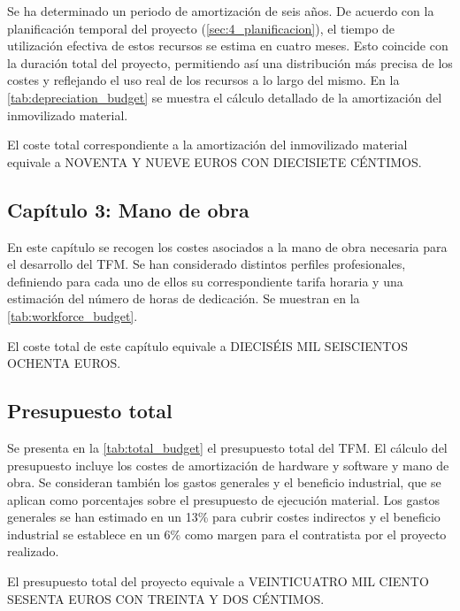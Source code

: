 Se ha determinado un periodo de amortización de seis años. De acuerdo con la planificación 
temporal del proyecto (\autoref{sec:4_planificacion}), el tiempo de utilización efectiva de estos recursos 
se estima en cuatro meses. Esto coincide con la duración total del proyecto, permitiendo así una distribución más
precisa de los costes y reflejando el uso real de los recursos a lo largo del mismo. En la \autoref{tab:depreciation_budget} 
se muestra el cálculo detallado de la amortización del inmovilizado material.



El coste total correspondiente a la amortización del inmovilizado material equivale a NOVENTA Y NUEVE EUROS CON DIECISIETE CÉNTIMOS.

\newpage

\subsection{Capítulo 3: Mano de obra} \label{sec:5_presupuesto_mano_obra}
En este capítulo se recogen los costes asociados a la mano de obra necesaria para el desarrollo del TFM. Se han considerado 
distintos perfiles profesionales, definiendo para cada uno de ellos su correspondiente tarifa horaria y una estimación del número de horas de dedicación.
Se muestran en la \autoref{tab:workforce_budget}.



El coste total de este capítulo equivale a DIECISÉIS MIL SEISCIENTOS OCHENTA EUROS.

\subsection{Presupuesto total} \label{sec:5_presupuesto_total}
Se presenta en la \autoref{tab:total_budget} el presupuesto total del TFM. El cálculo del
presupuesto incluye los costes de amortización de hardware y software y mano de obra. Se
consideran también los gastos generales y el beneficio industrial, que se aplican como
porcentajes sobre el presupuesto de ejecución material. Los gastos generales se han estimado en
un 13\% para cubrir costes indirectos y el beneficio industrial se establece en un 6\% como margen
para el contratista por el proyecto realizado.



El presupuesto total del proyecto equivale a VEINTICUATRO MIL CIENTO SESENTA EUROS CON TREINTA Y DOS CÉNTIMOS.
